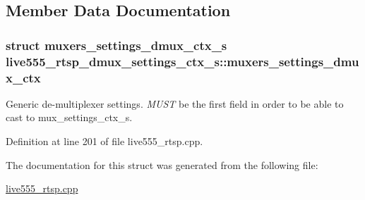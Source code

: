 \subsection{Member Data Documentation}
\subsubsection[{\texorpdfstring{muxers\+\_\+settings\+\_\+dmux\+\_\+ctx}{muxers_settings_dmux_ctx}}]{\setlength{\rightskip}{0pt plus 5cm}struct {\bf muxers\+\_\+settings\+\_\+dmux\+\_\+ctx\+\_\+s} live555\+\_\+rtsp\+\_\+dmux\+\_\+settings\+\_\+ctx\+\_\+s\+::muxers\+\_\+settings\+\_\+dmux\+\_\+ctx}\hypertarget{structlive555__rtsp__dmux__settings__ctx__s_af1c689c7f424a63ac4f5fa09d1832c15}{}\label{structlive555__rtsp__dmux__settings__ctx__s_af1c689c7f424a63ac4f5fa09d1832c15}
Generic de-\/multiplexer settings. {\itshape M\+U\+ST} be the first field in order to be able to cast to mux\+\_\+settings\+\_\+ctx\+\_\+s. 

Definition at line 201 of file live555\+\_\+rtsp.\+cpp.



The documentation for this struct was generated from the following file\+:\begin{DoxyCompactItemize}
\item 
\hyperlink{live555__rtsp_8cpp}{live555\+\_\+rtsp.\+cpp}\end{DoxyCompactItemize}
